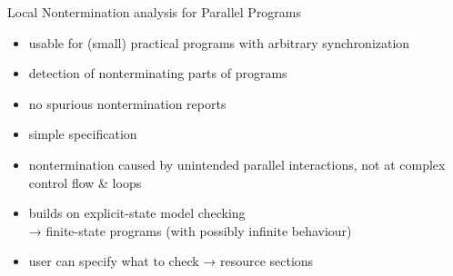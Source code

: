 \documentclass[aspectratio=169, fi]{paradise-slide}
\begin{document}
\begin{frame}[fragile]{Local Nontermination analysis for Parallel Programs}
  \setlength{\leftmargini}{1em}
  \begin{itemize}
    \item usable for (small) practical programs with arbitrary synchronization
    \item detection of nonterminating parts of programs
    \item no spurious nontermination reports
    \item simple specification
    \item nontermination caused by unintended parallel interactions, not at complex control flow \& loops \pause
  \pause
  \bigskip
    \item builds on explicit-state model checking\\
      → finite-state programs (with possibly infinite behaviour)
    \item user can specify what to check → resource sections
  \end{itemize}

%
\end{frame}
\end{document}
